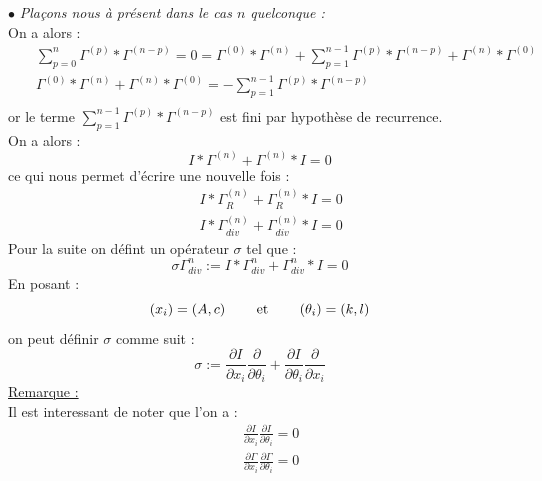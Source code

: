 \documentclass[a4paper,11pt]{article}
\theoremstyle{plain}
\theoremstyle{definition}
\theoremstyle{remark}
\numberwithin{equation}{section}
\numberwithin{equation}{subsection}
\numberwithin{figure}{section}
\begin{document}
\noindent
$\bullet$ \textit{Plaçons nous à présent dans le cas $n$ quelconque :}  \\
On a alors :
\begin{eqnarray}
 &&\sum_{p=0}^{n} \Gamma^{(p)} * \Gamma^{(n-p)} = 0 = \Gamma^{(0)} * \Gamma^{(n)} + \sum_{p=1}^{n-1} \Gamma^{(p)} * \Gamma^{(n-p)} 
+ \Gamma^{(n)} * \Gamma^{(0)}\\
 &&\Gamma^{(0)} * \Gamma^{(n)} + \Gamma^{(n)} * \Gamma^{(0)} = -\sum_{p=1}^{n-1} \Gamma^{(p)} * \Gamma^{(n-p)} \\
\end{eqnarray}
or le terme $ \sum_{p=1}^{n-1} \Gamma^{(p)} * \Gamma^{(n-p)}$ est fini par hypothèse de recurrence.\\
On a alors : 
\begin{equation}
 I * \Gamma^{(n)} + \Gamma^{(n)} * I = 0
\end{equation}
ce qui nous permet d'écrire une nouvelle fois :
\begin{eqnarray}
  && I * \Gamma^{(n)}_{R} + \Gamma^{(n)}_{R} * I = 0   \\
  && I * \Gamma^{(n)}_{div} + \Gamma^{(n)}_{div} * I = 0
\end{eqnarray}
Pour la suite on défint un opérateur $\sigma$ tel que :
\begin{equation}
 \sigma \Gamma^{n}_{div} := I * \Gamma^{n}_{div} + \Gamma^{n}_{div} * I = 0
\end{equation}
En posant :
\begin{equation}
 \left(x_{i}\right) = \left(A,c\right) \text{ \hspace{5mm} et \hspace{5mm} }  \left(\theta_{i}\right) = \left(k,l\right)
\end{equation}
on peut définir $\sigma$ comme suit :
\begin{equation}
 \sigma := \frac{\partial I}{\partial x_{i}} \frac{\partial}{\partial \theta_{i}} + 
\frac{\partial I}{\partial \theta_{i}} \frac{\partial}{\partial x_{i}}
\end{equation}
\underline{Remarque :}\\
Il est interessant de noter que l'on a :
\begin{eqnarray}
 && \frac{\partial I}{\partial x_{i}} \frac{\partial I}{\partial \theta_{i}} = 0 \\
 && \frac{\partial \Gamma}{\partial x_{i}} \frac{\partial \Gamma}{\partial \theta_{i}} = 0
\end{eqnarray}\\
\end{document}

